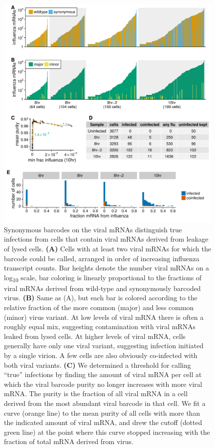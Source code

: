 \documentclass[9pt,lineno]{elife}
\begin{document}
\begin{figure}[t!]
\centerline{\includegraphics[width=0.82\linewidth]{figures/p_frac_flu_summary.pdf}}
\caption{\label{fig:viralbarcodes}
Synonymous barcodes on the viral mRNAs distinguish true infections from cells that contain viral mRNAs derived from leakage of lysed cells.
{\bf (A)}
Cells with at least two viral mRNAs for which the barcode could be called, arranged in order of increasing influenza transcript counts.
Bar heights denote the number viral mRNAs on a log\textsubscript{10} scale, bar coloring is linearly proportional to the fractions of viral mRNAs derived from wild-type and synonymously barcoded virus.
{\bf (B)}
Same as (A), but each bar is colored according to the relative fraction of the more common (major) and less common (minor) virus variant.
At low levels of viral mRNA there is often a roughly equal mix, suggesting contamination with viral mRNAs leaked from lysed cells.
At higher levels of viral mRNA, cells generally have only one viral variant, suggesting infection initiated by a single virion.
A few cells are also obviously co-infected with both viral variants.
{\bf (C)}
We determined a threshold for calling ``true'' infections by finding the amount of viral mRNA per cell at which the viral barcode purity no longer increases with more viral mRNA.
The purity is the fraction of all viral mRNA in a cell derived from the most abundant viral barcode in that cell.
We fit a curve (orange line) to the mean purity of all cells with more than the indicated amount of viral mRNA, and drew the cutoff (dotted green line) at the point where this curve stopped increasing with the fraction of total mRNA derived from virus.
}
\end{figure}
\end{document}
